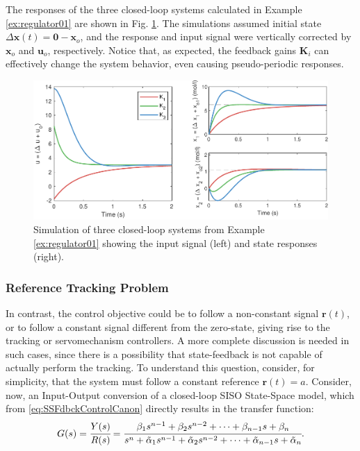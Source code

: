 \documentclass[a4paper,11pt]{book}
\numberwithin{figure}{chapter}
\numberwithin{equation}{chapter}
\numberwithin{table}{chapter}
\theoremstyle{definition}
\begin{document}
The responses of the three closed-loop systems calculated in Example \ref{ex:regulator01} are shown in Fig. \ref{fig:regulator01}. The simulations assumed initial state $\Delta \bm{x}(t) = \bm{0} - \bm{x}_o$, and the response and input signal were vertically corrected by $\bm{x}_o$ and $\bm{u}_o$, respectively. Notice that, as expected, the feedback gains $\bm{K}_i$ can effectively change the system behavior, even causing pseudo-periodic responses.	

\begin{figure}[ht] \centering
    \includegraphics[width=\textwidth]{chapter3/report_ch3_1}
    
    \caption{Simulation of three closed-loop systems from Example \ref{ex:regulator01} showing the input signal (left) and state responses (right).}
    \label{fig:regulator01}
\end{figure}

\subsubsection{Reference Tracking Problem}

In contrast, the control objective could be to follow a non-constant signal $\bm{r}(t)$, or to follow a constant signal different from the zero-state, giving rise to the tracking or servomechanism controllers. A more complete discussion is needed in such cases, since there is a possibility that state-feedback is not capable of actually perform the tracking. To understand this question, consider, for simplicity, that the system must follow a constant reference $\bm{r}(t) = a$. Consider, now, an Input-Output conversion of a closed-loop SISO State-Space model, which from \eqref{eq:SSFdbckControlCanon} directly results in the transfer function:
\begin{equation}
    G(s) = \cfrac{Y(s)}{R(s)} = \cfrac{\beta_1 s^{n-1} + \beta_2 s^{n-2} + \cdots + \beta_{n-1} s + \beta_n}{s^{n} + \tilde{\alpha}_1 s^{n-1} + \tilde{\alpha}_2 s^{n-2} + \cdots + \tilde{\alpha}_{n-1} s + \tilde{\alpha}_n}
.\end{equation}
\end{document}
